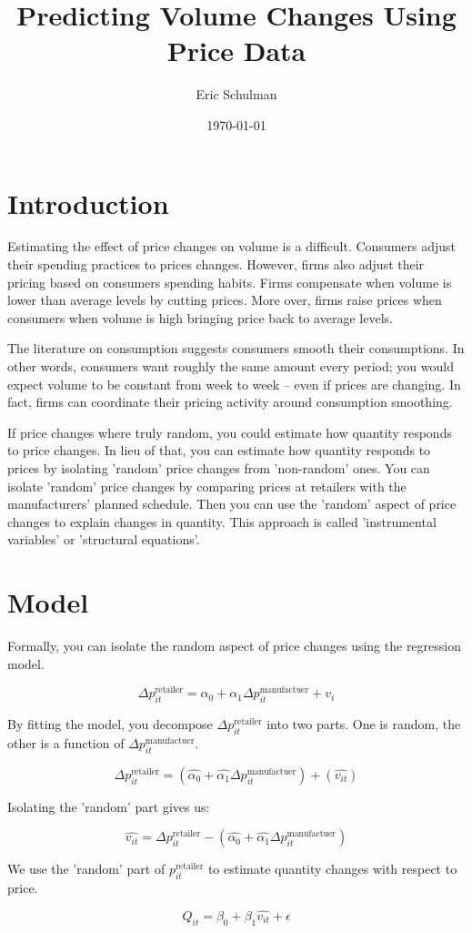 \documentclass{article}
\title{Predicting Volume Changes Using Price Data}
\author{Eric Schulman}
\date{\today}
\begin{document}
\maketitle

\section{Introduction}

Estimating the effect of price changes on volume is a difficult. Consumers adjust their spending practices to prices changes.  However, firms also adjust their pricing based on consumers spending habits. Firms compensate when volume is lower than average levels by cutting prices. More over, firms raise prices when consumers when volume is high bringing price back to average levels.

The literature on consumption suggests consumers smooth their consumptions. In other words, consumers want roughly the same amount every period; you would expect volume to be constant from week to week -- even if prices are changing. In fact, firms can coordinate their pricing activity around consumption smoothing.

If price changes where truly random, you could estimate how quantity responds to price changes. In lieu of that, you can estimate how quantity responds to prices by isolating 'random' price changes from 'non-random' ones. You can isolate 'random' price changes by comparing prices at retailers with the manufacturers' planned schedule. Then you can use the 'random' aspect of price changes to explain changes in quantity. This approach is called 'instrumental variables' or 'structural equations'.

\section{Model}

Formally, you can isolate the random aspect of price changes using the regression model.

$$\Delta p^{\text{retailer}}_{it} = \alpha_0 + \alpha_1 \Delta p^{\text{manufactuer}}_{it} + v_i$$

By fitting the model, you decompose $\Delta p^{\text{retailer}}_{it}$ into two parts. One is random, the other is a function of $\Delta p^{\text{manufactuer}}_{it}$.

$$\Delta  p^{\text{retailer}}_{it} = (\hat{\alpha_0} + \hat{\alpha_1} \Delta p^{\text{manufactuer}}_{it}) + (\hat{v_{it}}) $$

Isolating the 'random' part gives us:

$$\hat{v_{it}} = \Delta  p^{\text{retailer}}_{it}  - (\hat{\alpha_0} + \hat{\alpha_1} \Delta p^{\text{manufactuer}}_{it})  $$

We use the 'random' part of $p^{\text{retailer}}_{it}$ to estimate quantity changes with respect to price.

$$Q_{it} = \beta_0 + \beta_1 \hat{v_{it}} + \epsilon$$
\end{document}
